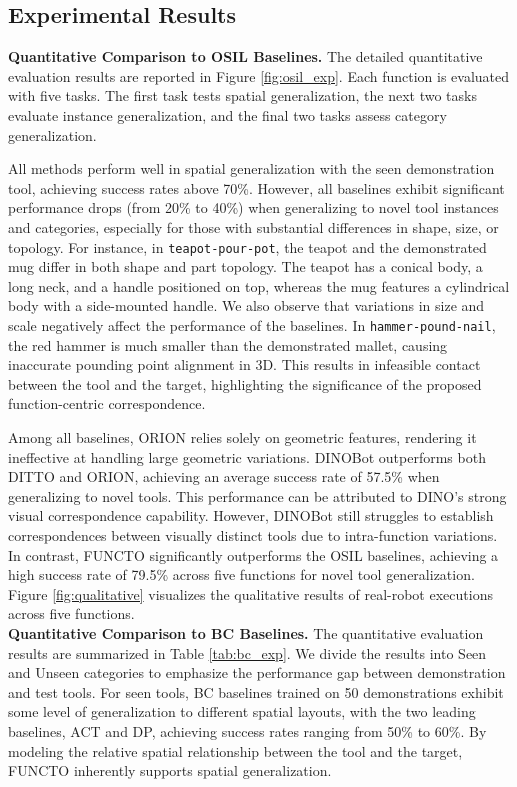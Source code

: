 \subsection{Experimental Results}
\noindent \textbf{Quantitative Comparison to OSIL Baselines.} The detailed quantitative evaluation results are reported in Figure \ref{fig:osil_exp}. Each function is evaluated with five tasks. The first task tests spatial generalization, the next two tasks evaluate instance generalization, and the final two tasks assess category generalization. 

All methods perform well in spatial generalization with the seen demonstration tool, achieving success rates above 70\%. However, all baselines exhibit significant performance drops (from 20\% to 40\%) when generalizing to novel tool instances and categories, especially for those with substantial differences in shape, size, or topology. For instance, in \texttt{teapot-pour-pot}, the teapot and the demonstrated mug differ in both shape and part topology. The teapot has a conical body, a long neck, and a handle positioned on top, whereas the mug features a cylindrical body with a side-mounted handle. We also observe that variations in size and scale negatively affect the performance of the baselines. In \texttt{hammer-pound-nail}, the red hammer is much smaller than the demonstrated mallet, causing inaccurate pounding point alignment in 3D. This results in infeasible contact between the tool and the target, highlighting the significance of the proposed function-centric correspondence. 

Among all baselines, ORION relies solely on geometric features, rendering it ineffective at handling large geometric variations. DINOBot outperforms both DITTO and ORION, achieving an average success rate of 57.5\% when generalizing to novel tools. This performance can be attributed to DINO's strong visual correspondence capability. However, DINOBot still struggles to establish correspondences between visually distinct tools due to intra-function variations. In contrast, FUNCTO significantly outperforms the OSIL baselines, achieving a high success rate of 79.5\% across five functions for novel tool generalization. Figure \ref{fig:qualitative} visualizes the qualitative results of real-robot executions across five functions. \\


\noindent \textbf{Quantitative Comparison to BC Baselines.} The quantitative evaluation results are summarized in Table \ref{tab:bc_exp}. We divide the results into Seen and Unseen categories to emphasize the performance gap between demonstration and test tools. For seen tools, BC baselines trained on 50 demonstrations exhibit some level of generalization to different spatial layouts, with the two leading baselines, ACT and DP, achieving success rates ranging from 50\% to 60\%.  By modeling the relative spatial relationship between the tool and the target, FUNCTO inherently supports spatial generalization.  

